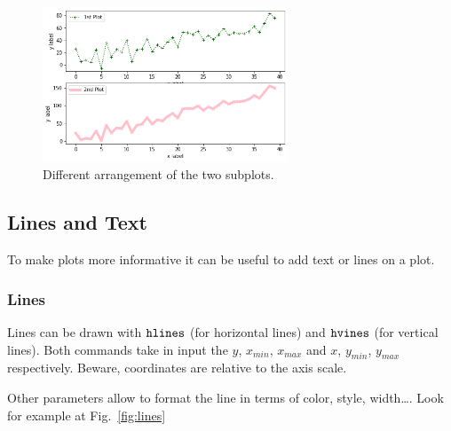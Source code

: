 \begin{figure}[h]
	\centering
	\includegraphics[width=0.65\textwidth]{figures/subplot2}
	\caption{Different arrangement of the two subplots.}
	\label{fig:subplot2}
\end{figure}

\subsection{Lines and Text}\label{lines-and-text}

To make plots more informative it can be useful to add text or lines on
a plot.

\subsubsection{Lines}\label{lines}

Lines can be drawn with \(\tt{hlines}\) (for horizontal lines) and
\(\tt{hvines}\) (for vertical lines). Both commands take in input the
\(y\), \(x_{min}\), \(x_{max}\) and \(x\), \(y_{min}\), \(y_{max}\)
respectively. Beware, coordinates are relative to the axis scale.

Other parameters allow to format the line in terms of color, style,
width\ldots. Look for example at Fig.~\ref{fig:lines}

